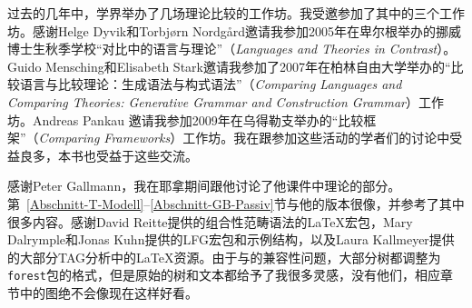 过去的几年中，学界举办了几场理论比较的工作坊。我受邀参加了其中的三个工作坊。感谢Helge Dyvik和Torbjørn Nordgård邀请我参加2005年在卑尔根举办的挪威博士生秋季学校“对比中的语言与理论”（\emph{Languages and Theories in Contrast}）。Guido Mensching和Elisabeth
Stark邀请我参加了2007年在柏林自由大学举办的“比较语言与比较理论：生成语法与构式语法”（\emph{Comparing Languages and Comparing Theories:
  Generative Grammar and Construction Grammar}）工作坊。Andreas Pankau 邀请我参加2009年在乌得勒支举办的“比较框架”（\emph{Comparing
  Frameworks}）工作坊。我在跟参加这些活动的学者们的讨论中受益良多，本书也受益于这些交流。

感谢Peter Gallmann，我在耶拿期间跟他讨论了他课件中\gb 理论的部分。第~\ref{Abschnitt-T-Modell}--\ref{Abschnitt-GB-Passiv}节与他的版本很像，并参考了其中很多内容。感谢David Reitte提供的组合性范畴语法的\LaTeX{}宏包，Mary Dalrymple和Jonas Kuhn提供的LFG宏包和示例结构，以及Laura Kallmeyer提供的大部分TAG分析中的\LaTeX{}资源。由于与\XeLaTeX 的兼容性问题，大部分树都调整为\texttt{forest}包的格式，但是原始的树和文本都给予了我很多灵感，没有他们，相应章节中的图绝不会像现在这样好看。

